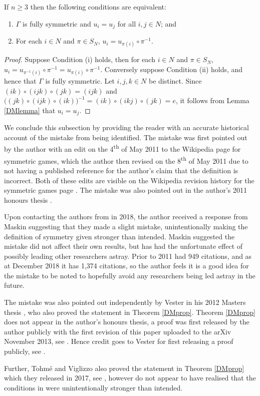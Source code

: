 \begin{theorem} \label{DMprop}
	If $n \geq 3$ then the following conditions are equivalent:
	\begin{enumerate}
		\item $\Gamma$ is fully symmetric and $u_i = u_j$ for all $i, j \in N$; and
		\item For each $i \in N$ and $\pi \in S_N$, $u_i = u_{\pi(i)} \circ \pi^{-1}$.
	\end{enumerate}
	\begin{proof}
		Suppose Condition (i) holds, then for each $i \in N$ and $\pi \in S_N$, $u_i = u_{\pi^{-1}(i)} \circ \pi^{-1} = u_{\pi(i)} \circ \pi^{-1}$. Conversely suppose Condition (ii) holds, and hence that $\Gamma$ is fully symmetric. Let $i, j, k \in N$ be distinct. Since $(ik) \circ (ijk) \circ (jk) = (ijk)$ and $\bigl((jk) \circ (ijk) \circ (ik)\bigr)^{-1} = (ik) \circ (ikj) \circ (jk) =  e$, it follows from Lemma \ref{DMlemma} that $u_i = u_j$. 
	\end{proof}
\end{theorem}

We conclude this subsection by providing the reader with an accurate historical account of the mistake from \cite[Definition 7]{DMaskin} being identified. The mistake was first pointed out by the author with an edit on the 4\textsuperscript{th} of May 2011 to the Wikipedia page for symmetric games, which the author then revised on the 8\textsuperscript{th} of May 2011 due to not having a published reference for the author's claim that the definition is incorrect. Both of these edits are visible on the Wikipedia revision history for the symmetric games page \cite{WikiSGRV}. The mistake was also pointed out in the author's 2011 honours thesis \cite[Subsection 5.8]{ham2011honoursthesis}.

Upon contacting the authors from \cite{DMaskin} in 2018, the author received a response from Maskin suggesting that they made a slight mistake, unintentionally making the definition of symmetry given stronger than intended. Maskin suggested the mistake did not affect their own results, but has had the unfortunate effect of possibly leading other researchers astray. Prior to 2011 \cite{DMaskin} had 949 citations, and as at December 2018 it has 1,374 citations, so the author feels it is a good idea for the mistake to be noted to hopefully avoid any researchers being led astray in the future.

The mistake was also pointed out independently by Vester in his 2012 Masters thesis \cite[Appendix B]{vester2012symmetric}, who also proved the statement in Theorem \ref{DMprop}. Theorem \ref{DMprop} does not appear in the author's honours thesis, a proof was first released by the author publicly with the first revision of this paper uploaded to the arXiv November 2013, see \cite[Version 1]{ham2018arxivversion}. Hence credit goes to Vester for first releasing a proof publicly, see \cite[Theorem 32]{vester2012symmetric}.

Further, Tohm\'{e} and Viglizzo also proved the statement in Theorem \ref{DMprop} which they released in 2017, see \cite[Lemma 2.10]{ViglizzoarXiv}, however do not appear to have realised that the conditions in \cite[Defintion 7]{DMaskin} were unintentionally stronger than intended.
